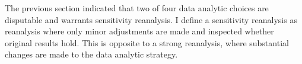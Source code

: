 The previous section indicated that two of four data analytic choices are disputable and warrants sensitivity reanalysis. I define a sensitivity reanalysis as reanalysis where only minor adjustments are made and inspected whether original results hold. This is opposite to a strong reanalysis, where substantial changes are made to the data analytic strategy.